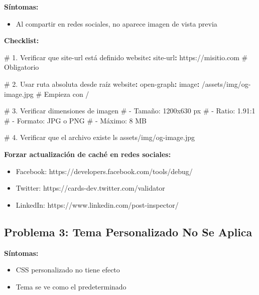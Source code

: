 \documentclass[
  doc,
  floatsintext,
  longtable,
  a4paper,
  nolmodern,
  notxfonts,
  notimes,
  12pt,
  colorlinks=true,linkcolor=blue,citecolor=blue,urlcolor=blue]{apa7}
\newenvironment{Shaded}{\begin{snugshade}}{\end{snugshade}}
\newcommand{\AttributeTok}[1]{\textcolor[rgb]{0.40,0.45,0.13}{#1}}
\newcommand{\CommentTok}[1]{\textcolor[rgb]{0.37,0.37,0.37}{#1}}
\newcommand{\FunctionTok}[1]{\textcolor[rgb]{0.28,0.35,0.67}{#1}}
\newcommand{\KeywordTok}[1]{\textcolor[rgb]{0.00,0.23,0.31}{\textbf{#1}}}
\providecommand{\tightlist}{%
  \setlength{\itemsep}{0pt}\setlength{\parskip}{0pt}}
\begin{document}
\textbf{Síntomas:}

\begin{itemize}
\tightlist
\item
  Al compartir en redes sociales, no aparece imagen de vista previa
\end{itemize}

\textbf{Checklist:}

\begin{Shaded}
\begin{Highlighting}[]
\CommentTok{\# 1. Verificar que site{-}url está definido}
\FunctionTok{website}\KeywordTok{:}
\AttributeTok{  }\FunctionTok{site{-}url}\KeywordTok{:}\AttributeTok{ https://misitio.com}\CommentTok{    \# Obligatorio}

\CommentTok{\# 2. Usar ruta absoluta desde raíz}
\FunctionTok{website}\KeywordTok{:}
\AttributeTok{  }\FunctionTok{open{-}graph}\KeywordTok{:}
\AttributeTok{    }\FunctionTok{image}\KeywordTok{:}\AttributeTok{ /assets/img/og{-}image.jpg}\CommentTok{  \# Empieza con /}

\CommentTok{\# 3. Verificar dimensiones de imagen}
\CommentTok{\# {-} Tamaño: 1200x630 px}
\CommentTok{\# {-} Ratio: 1.91:1}
\CommentTok{\# {-} Formato: JPG o PNG}
\CommentTok{\# {-} Máximo: 8 MB}

\CommentTok{\# 4. Verificar que el archivo existe}
\AttributeTok{ls assets/img/og{-}image.jpg}
\end{Highlighting}
\end{Shaded}

\textbf{Forzar actualización de caché en redes sociales:}

\begin{itemize}
\tightlist
\item
  Facebook: https://developers.facebook.com/tools/debug/
\item
  Twitter: https://cards-dev.twitter.com/validator
\item
  LinkedIn: https://www.linkedin.com/post-inspector/
\end{itemize}

\subsection{Problema 3: Tema Personalizado No Se
Aplica}\label{problema-3-tema-personalizado-no-se-aplica}

\textbf{Síntomas:}

\begin{itemize}
\tightlist
\item
  CSS personalizado no tiene efecto
\item
  Tema se ve como el predeterminado
\end{itemize}
\end{document}
